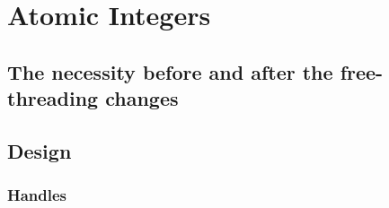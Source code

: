\chapter{Atomic Integers}

\section{The necessity before and after the free-threading changes}

\section{Design}
\subsection{Handles}
